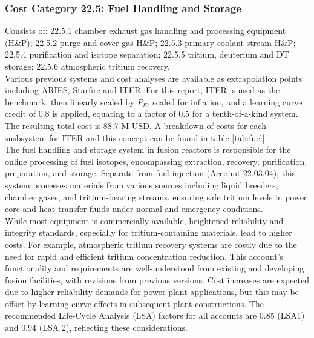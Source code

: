 \subsubsection{Cost Category 22.5: Fuel Handling and Storage}

Consists of: 22.5.1 chamber exhaust gas handling and processing equipment (H\&P); 22.5.2 purge and cover gas H\&P; 22.5.3 primary coolant stream H\&P; 22.5.4 purification and isotope separation; 22.5.5 tritium, deuterium and DT storage; 22.5.6 atmospheric tritium recovery.\\

Various previous systems and cost analyses are available as extrapolation points including ARIES, Starfire and ITER. For this report, ITER is used as the benchmark, then linearly scaled by $P_E$, scaled for inflation, and a learning curve credit of 0.8 is applied, equating to a factor of 0.5 for a tenth-of-a-kind system. The resulting total cost is 88.7 M USD. A breakdown of costs for each susbsystem for ITER and this concept can be found in table \ref{tab:fuel}.\\

The fuel handling and storage system in fusion reactors is responsible for the online processing of fuel isotopes, encompassing extraction, recovery, purification, preparation, and storage. Separate from fuel injection (Account 22.03.04), this system processes materials from various sources including liquid breeders, chamber gases, and tritium-bearing streams, ensuring safe tritium levels in power core and heat transfer fluids under normal and emergency conditions.\\

While most equipment is commercially available, heightened reliability and integrity standards, especially for tritium-containing materials, lead to higher costs. For example, atmospheric tritium recovery systems are costly due to the need for rapid and efficient tritium concentration reduction. This account's functionality and requirements are well-understood from existing and developing fusion facilities, with revisions from previous versions. Cost increases are expected due to higher reliability demands for power plant applications, but this may be offset by learning curve effects in subsequent plant constructions. The recommended Life-Cycle Analysis (LSA) factors for all accounts are 0.85 (LSA1) and 0.94 (LSA 2), reflecting these considerations.


